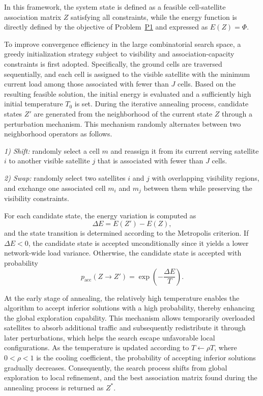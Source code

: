 \documentclass[journal]{IEEEtran}
\begin{document}
In this framework, the system state is defined as a feasible cell-satellite association matrix $Z$ satisfying all constraints, while the energy function is directly defined by the objective of Problem~\hyperref[prob:p1]{P1} and expressed as $E(Z)=\Phi$.

To improve convergence efficiency in the large combinatorial search space, a greedy initialization strategy subject to visibility and association-capacity constraints is first adopted. Specifically, the ground cells are traversed sequentially, and each cell is assigned to the visible satellite with the minimum current load among those associated with fewer than $J$ cells. Based on the resulting feasible solution, the initial energy is evaluated and a sufficiently high initial temperature $T_0$ is set. During the iterative annealing process, candidate states $Z'$ are generated from the neighborhood of the current state $Z$ through a perturbation mechanism. This mechanism randomly alternates between two neighborhood operators as follows.

\textit{1) Shift:} randomly select a cell $m$ and reassign it from its current serving satellite $i$ to another visible satellite $j$ that is associated with fewer than $J$ cells.

\textit{2) Swap:} randomly select two satellites $i$ and $j$ with overlapping visibility regions, and exchange one associated cell $m_i$ and $m_j$ between them while preserving the visibility constraints.

For each candidate state, the energy variation is computed as
\begin{equation}
\Delta E=E(Z')-E(Z),
\label{eq:isa-delta}
\end{equation}
and the state transition is determined according to the Metropolis criterion. If $\Delta E<0$, the candidate state is accepted unconditionally since it yields a lower network-wide load variance. Otherwise, the candidate state is accepted with probability
\begin{equation}
p_{\mathrm{acc}}(Z\!\rightarrow\!Z')=\exp\left(-\frac{\Delta E}{T}\right).
\label{eq:isa-metropolis}
\end{equation}

At the early stage of annealing, the relatively high temperature enables the algorithm to accept inferior solutions with a high probability, thereby enhancing the global exploration capability. This mechanism allows temporarily overloaded satellites to absorb additional traffic and subsequently redistribute it through later perturbations, which helps the search escape unfavorable local configurations. As the temperature is updated according to $T\leftarrow\rho T$, where $0<\rho<1$ is the cooling coefficient, the probability of accepting inferior solutions gradually decreases. Consequently, the search process shifts from global exploration to local refinement, and the best association matrix found during the annealing process is returned as $Z^*$.
\end{document}
